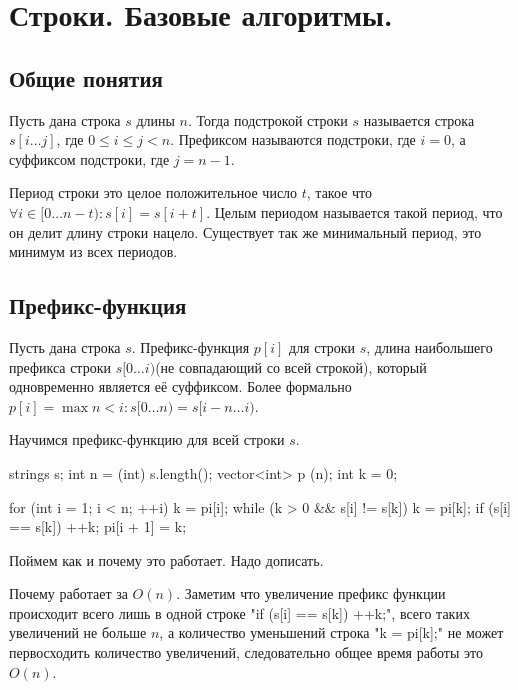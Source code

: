\section{Строки. Базовые алгоритмы.}

\subsection{Общие понятия}

Пусть дана строка $s$ длины $n$. 
Тогда подстрокой строки $s$ называется строка $s[i \dots j]$, где $0 \le i \le j < n$.
Префиксом называются подстроки, где $i = 0$, а суффиксом подстроки, где $j = n - 1$.

Период строки это целое положительное число $t$, такое что $\forall i \in [0 \dots n-t) \colon s[i] = s[i + t]$.
Целым периодом называется такой период, что он делит длину строки нацело. 
Существует так же минимальный период, это минимум из всех периодов.

\subsection{Префикс-функция}
Пусть дана строка $s$. 
Префикс-функция $p[i]$ для строки $s$, длина наибольшего префикса строки $s[0 \dots i)$(не совпадающий со всей строкой), который одновременно является её суффиксом.
Более формально $p[i] = \max n < i \colon s[0 \dots n) = s[i - n \dots i)$.

Научимся префикс-функцию для всей строки $s$.

\begin{cppcode}
strings s;
int n = (int) s.length();
vector<int> p (n);
int k = 0;

for (int i = 1; i < n; ++i) {
  k = pi[i];
  while (k > 0 && s[i] != s[k])
    k = pi[k];
  if (s[i] == s[k]) ++k;
  pi[i + 1] = k;
}
\end{cppcode}

Поймем как и почему это работает. 
Надо дописать.

Почему работает за $O(n)$.
Заметим что увеличение префикс функции происходит всего лишь в одной строке \cpp"if (s[i] == s[k]) ++k;", всего таких увеличений не больше $n$, а количество уменьшений строка \cpp"k = pi[k];" не может первосходить количество увеличений, следовательно общее время работы это $O(n)$.

